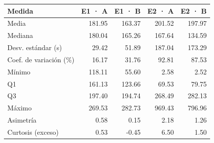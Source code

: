 \begin{tabular}{lrrrr}
\toprule
\textbf{Medida} & \textbf{E1 · A} & \textbf{E1 · B} & \textbf{E2 · A} & \textbf{E2 · B} \\ \midrule
Media & 181.95 & 163.37 & 201.52 & 197.97 \\
Mediana & 180.04 & 165.26 & 167.64 & 134.59 \\
Desv. estándar (s) & 29.42 & 51.89 & 187.04 & 173.29 \\
Coef. de variación (\%) & 16.17 & 31.76 & 92.81 & 87.53 \\
Mínimo & 118.11 & 55.60 & 2.58 & 2.52 \\
Q1 & 161.13 & 123.66 & 69.53 & 79.75 \\
Q3 & 197.40 & 194.74 & 268.49 & 282.13 \\
Máximo & 269.53 & 282.73 & 969.43 & 796.96 \\
Asimetría & 0.58 & 0.15 & 2.18 & 1.26 \\
Curtosis (exceso) & 0.53 & -0.45 & 6.50 & 1.50 \\
\bottomrule
\end{tabular}